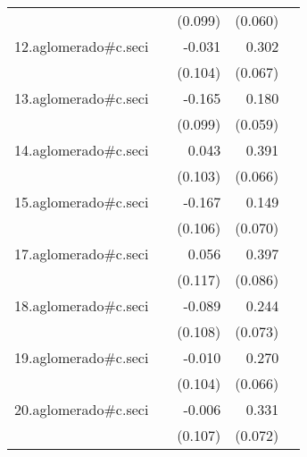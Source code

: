 {\begin{longtable}{l*{4}{D{.}{.}{-1}}}
            &                     &     (0.099)         &     (0.060)         &                     \\
\addlinespace
12.aglomerado#c.seci&                     &      -0.031         &       0.302\sym{***}&                     \\
            &                     &     (0.104)         &     (0.067)         &                     \\
\addlinespace
13.aglomerado#c.seci&                     &      -0.165         &       0.180\sym{**} &                     \\
            &                     &     (0.099)         &     (0.059)         &                     \\
\addlinespace
14.aglomerado#c.seci&                     &       0.043         &       0.391\sym{***}&                     \\
            &                     &     (0.103)         &     (0.066)         &                     \\
\addlinespace
15.aglomerado#c.seci&                     &      -0.167         &       0.149\sym{*}  &                     \\
            &                     &     (0.106)         &     (0.070)         &                     \\
\addlinespace
17.aglomerado#c.seci&                     &       0.056         &       0.397\sym{***}&                     \\
            &                     &     (0.117)         &     (0.086)         &                     \\
\addlinespace
18.aglomerado#c.seci&                     &      -0.089         &       0.244\sym{***}&                     \\
            &                     &     (0.108)         &     (0.073)         &                     \\
\addlinespace
19.aglomerado#c.seci&                     &      -0.010         &       0.270\sym{***}&                     \\
            &                     &     (0.104)         &     (0.066)         &                     \\
\addlinespace
20.aglomerado#c.seci&                     &      -0.006         &       0.331\sym{***}&                     \\
            &                     &     (0.107)         &     (0.072)         &                     \\

\end{longtable}}
